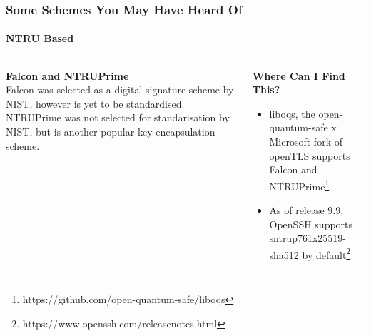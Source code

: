 \documentclass[
aspectratio=169, %
t, %
onlytextwidth, %
10pt, %
]{beamer}
\begin{document}
\begin{frame}
    \frametitle{Some Schemes You May Have Heard Of}
    \framesubtitle{NTRU Based}

    \begin{columns}[T] %
        \begin{column}{0.42\linewidth} %
            \textbf{Falcon and NTRUPrime}\\
            
            Falcon was selected as a digital signature scheme by NIST, however is yet to be standardised. NTRUPrime was not selected for standarisation by NIST, but is another popular key encapsulation scheme.
        \end{column}
        \begin{column}{0.55\linewidth} %
            \textbf{Where Can I Find This?}\\
            \begin{itemize}
                \item liboqs, the open-quantum-safe x Microsoft fork of openTLS supports Falcon and NTRUPrime\footnote{https://github.com/open-quantum-safe/liboqs}
                \item As of release 9.9, OpenSSH supports sntrup761x25519-sha512 by default\footnote{https://www.openssh.com/releasenotes.html}
            \end{itemize}
        \end{column}
    \end{columns}
\end{frame}

\end{document}
